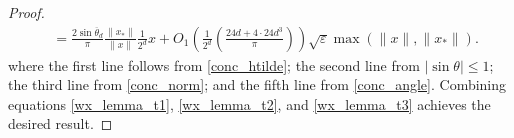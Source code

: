 \documentclass[11pt]{article}
\renewcommand{\epsilon}{\varepsilon}
\renewcommand{\top}{{\mathrm{T}}}
\theoremstyle{remark}
\begin{document}
\begin{proof}
\begin{align}
    & = \frac{2\sin \overline{\theta}_d}{\pi}\frac{\|x_*\|}{\|x\|}\frac{1}{2^d}x + O_1\left(\frac{1}{2^d}\left(\frac{24d + 4\cdot 24d^3}{\pi}\right)\right)\sqrt{\epsilon}\max(\|x\|,\|x_*\|). \label{wx_lemma_t3}
\end{align} where the first line follows from \eqref{conc_htilde}; the second line from $|\sin \theta| \leqslant 1$; the third line from \eqref{conc_norm}; and the fifth line from \eqref{conc_angle}. Combining equations \eqref{wx_lemma_t1}, \eqref{wx_lemma_t2}, and \eqref{wx_lemma_t3} achieves the desired result.%


\end{proof}
\end{document}
